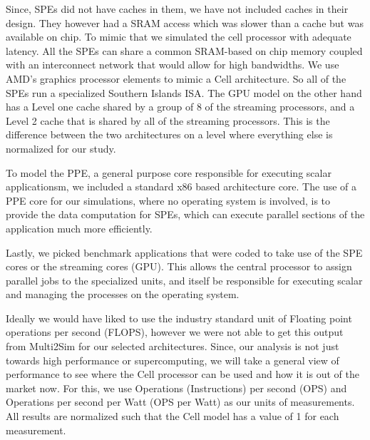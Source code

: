 \documentclass{sig-alternate-05-2015}
\begin{document}

Since, SPEs did not have caches in them, we have not included caches in their design. They however had a SRAM access which was slower than a cache but was available on chip. To mimic that we simulated the cell processor with adequate latency. All the SPEs can share a common SRAM-based on chip memory coupled with an interconnect network that would allow for high bandwidths. We use AMD’s graphics processor elements to mimic a Cell architecture. So all of the SPEs run a specialized Southern Islands ISA. The GPU model on the other hand has a Level one cache shared by a group of  8 of the streaming processors, and a Level 2 cache that is shared by all of the streaming processors. This is the difference between the two architectures on a level where everything else is normalized for our study. 

To model the PPE, a general purpose core responsible for executing scalar applicationsm, we included a standard x86 based architecture core. The use of a PPE core for our simulations, where no operating system is involved, is to provide the data computation for SPEs, which can execute parallel sections of the application much more efficiently. 

Lastly, we picked benchmark applications that were coded to take use of the SPE cores or the streaming cores (GPU). This allows the central processor to assign parallel jobs to the specialized units, and itself be responsible for executing scalar and managing the processes on the operating system.

Ideally we would have liked to use the industry standard unit of Floating point operations per second (FLOPS), however we were not able to get this output from Multi2Sim for our selected architectures. Since, our analysis is not just towards high performance or supercomputing, we will take a general view of performance to see where the Cell processor can be used and how it is out of the market now. For this, we use Operations (Instructions) per second (OPS) and Operations per second per Watt (OPS per Watt) as our units of measurements. All results are normalized such that the Cell model has a value of 1 for each measurement.
\end{document}
